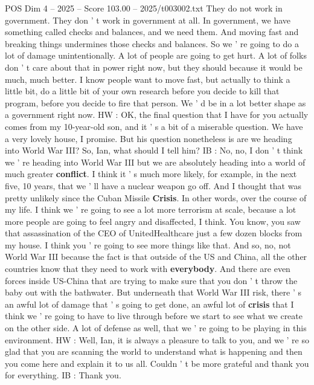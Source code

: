 \begin{textsample}{POS Dim 4 – 2025 – Score 103.00 – 2025/t003002.txt}
They do not work in government.
They don ' t work in government at all.
In government, we have something called checks and balances, and we need them.
And moving fast and breaking things undermines those checks and balances.
So we ' re going to do a lot of damage unintentionally.
A lot of people are going to get hurt.
A lot of folks don ' t care about that in power right now, but they should because it would be much, much better.
I know people want to move fast, but actually to think a little bit, do a little bit of your own research before you decide to kill that program, before you decide to fire that person.
We ' d be in a lot better shape as a government right now.
HW : OK, the final question that I have for you actually comes from my 10-year-old son, and it ' s a bit of a miserable question.
We have a very lovely house, I promise.
But his question nonetheless is are we heading into World War III?
So, Ian, what should I tell him?
IB : No, no, I don ' t think we ' re heading into World War III but we are absolutely heading into a world of much greater \textbf{conflict}.
I think it ' s much more likely, for example, in the next five, 10 years, that we ' ll have a nuclear weapon go off.
And I thought that was pretty unlikely since the Cuban Missile \textbf{Crisis}.
In other words, over the course of my life.
I think we ' re going to see a lot more terrorism at scale, because a lot more people are going to feel angry and disaffected, I think.
You know, you saw that assassination of the CEO of UnitedHealthcare just a few dozen blocks from my house.
I think you ' re going to see more things like that.
And so, no, not World War III because the fact is that outside of the US and China, all the other countries know that they need to work with \textbf{everybody}.
And there are even forces inside US-China that are trying to make sure that you don ' t throw the baby out with the bathwater.
But underneath that World War III risk, there ' s an awful lot of damage that ' s going to get done, an awful lot of \textbf{crisis} that I think we ' re going to have to live through before we start to see what we create on the other side.
A lot of defense as well, that we ' re going to be playing in this environment.
HW : Well, Ian, it is always a pleasure to talk to you, and we ' re so glad that you are scanning the world to understand what is happening and then you come here and explain it to us all.
Couldn ' t be more grateful and thank you for everything.
IB : Thank you.

\end{textsample}
